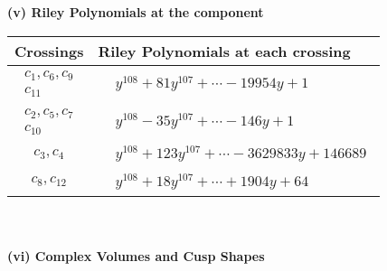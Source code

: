 \documentclass[1p]{elsarticle_modified}
\theoremstyle{definition}
\begin{document}
\newpage\renewcommand{\arraystretch}{1}
\flushleft \textbf{(v) Riley Polynomials at the component}\newline \\
\begin{tabular}{m{50pt}|m{274pt}}
Crossings & \hspace{64pt}Riley Polynomials at each crossing \\
\hline $$\begin{aligned}c_{1},c_{6},c_{9}\\c_{11}\end{aligned}$$&$\begin{aligned}
&y^{108}+81 y^{107}+\cdots-19954 y+1
\end{aligned}$\\
\hline $$\begin{aligned}c_{2},c_{5},c_{7}\\c_{10}\end{aligned}$$&$\begin{aligned}
&y^{108}-35 y^{107}+\cdots-146 y+1
\end{aligned}$\\
\hline $$\begin{aligned}c_{3},c_{4}\end{aligned}$$&$\begin{aligned}
&y^{108}+123 y^{107}+\cdots-3629833 y+146689
\end{aligned}$\\
\hline $$\begin{aligned}c_{8},c_{12}\end{aligned}$$&$\begin{aligned}
&y^{108}+18 y^{107}+\cdots+1904 y+64
\end{aligned}$\\
\hline
\end{tabular}\\~\\
\newpage\flushleft \textbf{(vi) Complex Volumes and Cusp Shapes}
\end{document}
